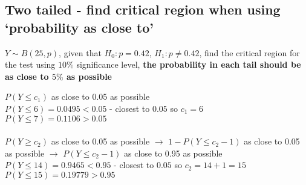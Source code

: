 \subsection{Two tailed - find critical region when using `probability as close to'}
\begin{example}
    $Y \sim B(25, p)$, given that $H_0: p=0.42$, $H_1:p \neq 0.42$, find the critical region for the test using $10\%$ significance level, \textbf{the probability in each tail should be as close to $5\%$ as possible}
\end{example}

\begin{solution}
    $P(Y\leq c_1)$ as close to 0.05 as possible\\
    $P(Y\leq 6) = 0.0495 < 0.05$ - closest to $0.05$ so $c_1 = 6$\\
    $P(Y\leq 7) = 0.1106 > 0.05$\\\\

    $P(Y\geq c_2)$ as close to 0.05 as possible $\rightarrow$ $1-P(Y\leq c_2 -1)$ as close to 0.05 as possible $\rightarrow$ $P(Y\leq c_2 -1)$ as close to 0.95 as possible\\
    $P(Y\leq 14) = 0.9465 < 0.95$ - closest to $0.05$ so $c_2 = 14+1 = 15$\\
    $P(Y\leq 15) = 0.19779 > 0.95$
\end{solution}
